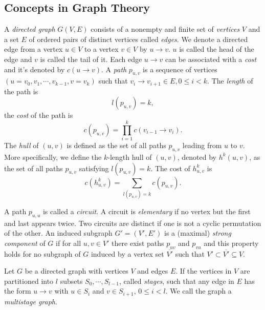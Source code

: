 \subsection{Concepts in Graph Theory}

A \textit{directed graph} $G(V, E)$ consists of a nonempty and finite set of \textit{vertices} $V$ and a set $E$ of ordered pairs of distinct vertices called \textit{edges}. We denote a directed edge from a vertex $u\in V$ to a vertex $v\in V$ by $u\rightarrow v$. $u$ is called the head of the edge and $v$ is called the tail of it. Each edge $u\rightarrow v$ can be associated with a \textit{cost} and it's denoted by $c(u\rightarrow v)$. A \textit{path} $p_{u,v}$ is a sequence of vertices $(u=v_0,v_1,\cdots,v_{k-1},v=v_k)$ such that $v_i\rightarrow v_{i+1}\in E, 0\leq i<k$. The \textit{length} of the path is
\[
    l(p_{u,v})=k,
\]
the \textit{cost} of the path is
\[
    c(p_{u,v})=\prod\limits_{i=1}^{k}c(v_{i-1}\rightarrow v_i).
\]
The \textit{hull} of $(u,v)$ is defined as the set of all paths $p_{u,v}$ leading from $u$ to $v$. More specifically, we define the $k$-length hull of $(u,v)$, denoted by $h^k(u,v)$, as the set of all paths $p_{u,v}$ satisfying $l(p_{u,v})=k$. The cost of $h^k_{u,v}$ is
\[
    c(h^k_{u,v})=\sum\limits_{l(p_{u,v})=k} c(p_{u,v}).
\]

A path $p_{u,u}$ is called a \textit{circuit}. A circuit is \textit{elementary} if no vertex but the first and last appears twice. Two circuits are distinct if one is not a cyclic permutation of the other. An induced subgraph $G'=(V',E')$ is a (maximal) \textit{strong component} of $G$ if for all $u, v\in V'$ there exist paths $p_{uv}$ and $p_{vu}$ and this property holds for no subgraph of $G$ induced by a vertex set $\overline{V'}$ such that $V' \subset \overline{V'} \subseteq V$.

Let $G$ be a directed graph with vertices $V$ and edges $E$. If the vertices in $V$ are partitioned into $l$ subsets $S_0,\cdots,S_{l-1}$, called \textit{stages}, such that any edge in $E$ has the form $u\rightarrow v$ with $u\in S_i$ and $v\in S_{i+1}$, $0\leq i<l$. We call the graph a \textit{multistage graph}.


